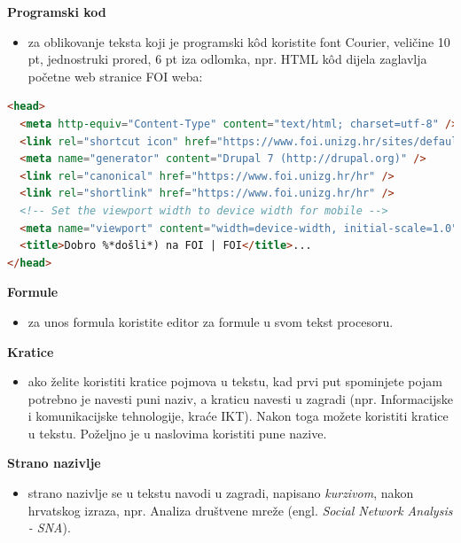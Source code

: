 \documentclass{foi}
\begin{document}
\begin{flushleft}\textbf{Programski kod}\end{flushleft}
\begin{itemize}
    \item za oblikovanje teksta koji je programski kôd koristite font Courier, veličine 10 pt, jednostruki prored, 6 pt iza odlomka, npr. HTML kôd dijela zaglavlja početne web stranice FOI weba:
\end{itemize}

\begin{lstlisting}[language=HTML]
<head>
  <meta http-equiv="Content-Type" content="text/html; charset=utf-8" />
  <link rel="shortcut icon" href="https://www.foi.unizg.hr/sites/default/files/favicon_0_1.ico" type="image/vnd.microsoft.icon" />
  <meta name="generator" content="Drupal 7 (http://drupal.org)" />
  <link rel="canonical" href="https://www.foi.unizg.hr/hr" />
  <link rel="shortlink" href="https://www.foi.unizg.hr/hr" />
  <!-- Set the viewport width to device width for mobile -->
  <meta name="viewport" content="width=device-width, initial-scale=1.0">
  <title>Dobro %*došli*) na FOI | FOI</title>...
</head>
\end{lstlisting}

\begin{flushleft}\textbf{Formule}\end{flushleft}
\begin{itemize}
    \item za unos formula koristite editor za formule u svom tekst procesoru.
\end{itemize}

\begin{flushleft}\textbf{Kratice}\end{flushleft}   
\begin{itemize}
    \item ako želite koristiti kratice pojmova u tekstu, kad prvi put spominjete pojam potrebno je navesti puni naziv, a kraticu navesti u zagradi (npr. Informacijske i komunikacijske tehnologije, kraće IKT). Nakon toga možete koristiti kratice u tekstu. Poželjno je u naslovima koristiti pune nazive.
\end{itemize}

\begin{flushleft}\textbf{Strano nazivlje}\end{flushleft}   
\begin{itemize}
    \item strano nazivlje se u tekstu navodi u zagradi, napisano \textit{kurzivom}, nakon hrvatskog izraza, npr. Analiza društvene mreže (engl. \textit{Social Network Analysis - SNA}).
\end{itemize}
\end{document}
